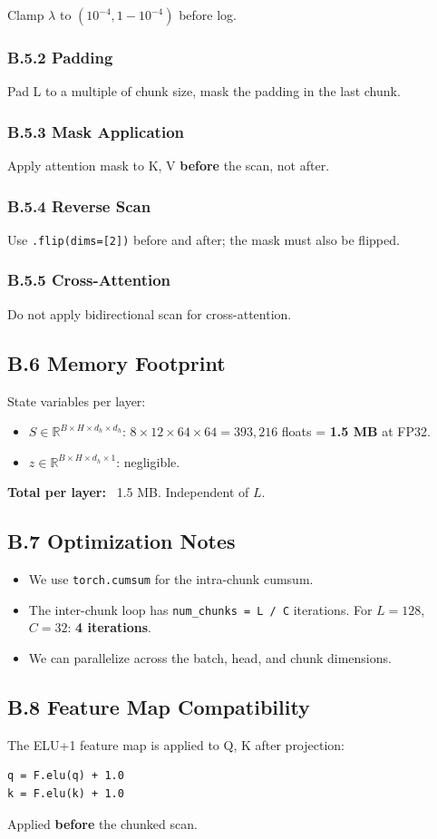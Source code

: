 Clamp $\lambda$ to $(10^{-4}, 1 - 10^{-4})$ before log.

\subsubsection{B.5.2 Padding}

Pad L to a multiple of chunk size, mask the padding in the last chunk.

\subsubsection{B.5.3 Mask Application}

Apply attention mask to K, V \textbf{before} the scan, not after.

\subsubsection{B.5.4 Reverse Scan}

Use \texttt{.flip(dims=[2])} before and after; the mask must also be flipped.

\subsubsection{B.5.5 Cross-Attention}

Do not apply bidirectional scan for cross-attention.

\subsection{B.6 Memory Footprint}

State variables per layer:
\begin{itemize}
\item $S \in \mathbb{R}^{B \times H \times d_h \times d_h}$: $8 \times 12 \times 64 \times 64 = 393,216$ floats = \textbf{1.5 MB} at FP32.
\item $z \in \mathbb{R}^{B \times H \times d_h \times 1}$: negligible.

\end{itemize}
\textbf{Total per layer:} ~1.5 MB. Independent of $L$.

\subsection{B.7 Optimization Notes}

\begin{itemize}
\item We use \texttt{torch.cumsum} for the intra-chunk cumsum.
\item The inter-chunk loop has \texttt{num\_chunks = L / C} iterations. For $L = 128$, $C = 32$: \textbf{4 iterations}.
\item We can parallelize across the batch, head, and chunk dimensions.

\end{itemize}
\subsection{B.8 Feature Map Compatibility}

The ELU+1 feature map is applied to Q, K after projection:

\begin{lstlisting}
q = F.elu(q) + 1.0
k = F.elu(k) + 1.0
\end{lstlisting}

Applied \textbf{before} the chunked scan.


